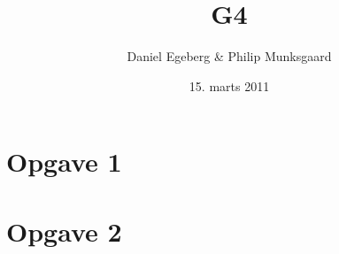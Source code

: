 \documentclass [10pt,a4paper]{article}
\title{G4}
\author{Daniel Egeberg \& Philip Munksgaard}
\date{15. marts 2011}
\begin{document}
\maketitle

\section*{Opgave 1} %


\section*{Opgave 2} %

\end{document}
